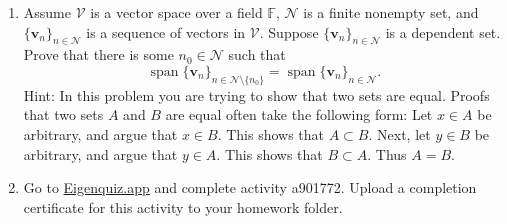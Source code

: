 \documentclass[12pt]{amsart}
\newcommand{\1}{\mathbbm{1}}
\numberwithin{equation}{section}
\numberwithin{Theorem}{section}
\theoremstyle{plain} %
\theoremstyle{definition}
\theoremstyle{remark}
\begin{document}
\begin{enumerate}[1.]
\bigskip
\newpage

\item Assume \(\mathcal{V}\) is a vector space over a field \(\mathbb{F}\), \(\mathcal{N}\) is a finite nonempty set, and \(\{\mathbf{v}_{n}\}_{n\in\mathcal{N}}\) is a sequence of vectors in \(\mathcal{V}\). Suppose \(\{\mathbf{v}_{n}\}_{n\in\mathcal{N}}\) is a dependent set.  Prove that there is some \(n_{0}\in\mathcal{N}\) such that
\[\operatorname{span}\{\mathbf{v}_{n}\}_{n\in\mathcal{N}\setminus\{n_{0}\}} = \operatorname{span}\{\mathbf{v}_{n}\}_{n\in\mathcal{N}}.\]
Hint: In this problem you are trying to show that two sets are equal. Proofs that two sets \(A\) and \(B\) are equal often take the following form: Let \(x\in A\) be arbitrary, and argue that \(x\in B\). This shows that \(A\subset B\). Next, let \(y\in B\) be arbitrary, and argue that \(y\in A\). This shows that \(B\subset A\). Thus \(A=B\).

\bigskip



\item Go to \href{https://eigenquiz.app/}{Eigenquiz.app} and complete activity a901772. Upload a completion certificate for this activity to your homework folder.
\end{enumerate}
\end{document}
